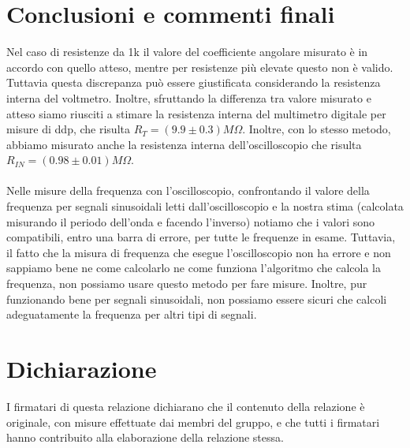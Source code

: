 \documentclass[10pt,a4paper]{article}
\begin{document}
\section{Conclusioni e commenti finali}
Nel caso di resistenze da 1k il valore del coefficiente angolare misurato è in accordo con quello atteso, mentre per resistenze più elevate questo non è valido. Tuttavia questa discrepanza può essere giustificata considerando la resistenza interna del voltmetro. Inoltre, sfruttando la differenza tra valore misurato e atteso siamo riusciti a stimare la resistenza interna del multimetro digitale per misure di ddp, che risulta $R_T = ( 9.9\pm  0.3)  M\Omega$. Inoltre, con lo stesso metodo, abbiamo misurato anche la resistenza interna dell'oscilloscopio che risulta $R_{IN} = (0.98 \pm  0.01)  M\Omega$. \\\\
Nelle misure della frequenza con  l'oscilloscopio, confrontando il valore della frequenza per segnali sinusoidali letti dall'oscilloscopio e la nostra stima (calcolata misurando il periodo dell'onda e facendo l'inverso) notiamo che i valori sono compatibili, entro una barra di errore, per tutte le frequenze in esame. Tuttavia, il fatto che la misura di frequenza che esegue l'oscilloscopio non ha errore e non sappiamo bene ne come calcolarlo ne come funziona l'algoritmo che calcola la frequenza, non possiamo usare questo metodo per fare misure. Inoltre, pur funzionando bene per segnali sinusoidali, non possiamo essere sicuri che calcoli adeguatamente la frequenza per altri tipi di segnali.

\section*{Dichiarazione}
I firmatari di questa relazione dichiarano che il contenuto della relazione \`e originale, con misure effettuate dai membri del gruppo, e che tutti i firmatari hanno contribuito alla elaborazione della relazione stessa.
\end{document}
